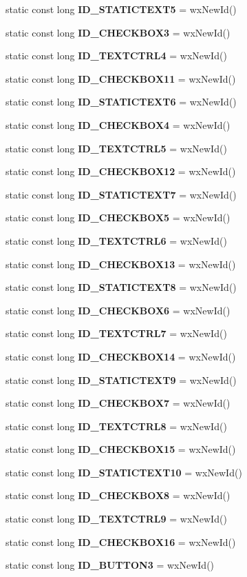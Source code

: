 \begin{DoxyCompactItemize}
\item 
static const long {\bf I\+D\+\_\+\+S\+T\+A\+T\+I\+C\+T\+E\+X\+T5} = wx\+New\+Id()
\item 
static const long {\bf I\+D\+\_\+\+C\+H\+E\+C\+K\+B\+O\+X3} = wx\+New\+Id()
\item 
static const long {\bf I\+D\+\_\+\+T\+E\+X\+T\+C\+T\+R\+L4} = wx\+New\+Id()
\item 
static const long {\bf I\+D\+\_\+\+C\+H\+E\+C\+K\+B\+O\+X11} = wx\+New\+Id()
\item 
static const long {\bf I\+D\+\_\+\+S\+T\+A\+T\+I\+C\+T\+E\+X\+T6} = wx\+New\+Id()
\item 
static const long {\bf I\+D\+\_\+\+C\+H\+E\+C\+K\+B\+O\+X4} = wx\+New\+Id()
\item 
static const long {\bf I\+D\+\_\+\+T\+E\+X\+T\+C\+T\+R\+L5} = wx\+New\+Id()
\item 
static const long {\bf I\+D\+\_\+\+C\+H\+E\+C\+K\+B\+O\+X12} = wx\+New\+Id()
\item 
static const long {\bf I\+D\+\_\+\+S\+T\+A\+T\+I\+C\+T\+E\+X\+T7} = wx\+New\+Id()
\item 
static const long {\bf I\+D\+\_\+\+C\+H\+E\+C\+K\+B\+O\+X5} = wx\+New\+Id()
\item 
static const long {\bf I\+D\+\_\+\+T\+E\+X\+T\+C\+T\+R\+L6} = wx\+New\+Id()
\item 
static const long {\bf I\+D\+\_\+\+C\+H\+E\+C\+K\+B\+O\+X13} = wx\+New\+Id()
\item 
static const long {\bf I\+D\+\_\+\+S\+T\+A\+T\+I\+C\+T\+E\+X\+T8} = wx\+New\+Id()
\item 
static const long {\bf I\+D\+\_\+\+C\+H\+E\+C\+K\+B\+O\+X6} = wx\+New\+Id()
\item 
static const long {\bf I\+D\+\_\+\+T\+E\+X\+T\+C\+T\+R\+L7} = wx\+New\+Id()
\item 
static const long {\bf I\+D\+\_\+\+C\+H\+E\+C\+K\+B\+O\+X14} = wx\+New\+Id()
\item 
static const long {\bf I\+D\+\_\+\+S\+T\+A\+T\+I\+C\+T\+E\+X\+T9} = wx\+New\+Id()
\item 
static const long {\bf I\+D\+\_\+\+C\+H\+E\+C\+K\+B\+O\+X7} = wx\+New\+Id()
\item 
static const long {\bf I\+D\+\_\+\+T\+E\+X\+T\+C\+T\+R\+L8} = wx\+New\+Id()
\item 
static const long {\bf I\+D\+\_\+\+C\+H\+E\+C\+K\+B\+O\+X15} = wx\+New\+Id()
\item 
static const long {\bf I\+D\+\_\+\+S\+T\+A\+T\+I\+C\+T\+E\+X\+T10} = wx\+New\+Id()
\item 
static const long {\bf I\+D\+\_\+\+C\+H\+E\+C\+K\+B\+O\+X8} = wx\+New\+Id()
\item 
static const long {\bf I\+D\+\_\+\+T\+E\+X\+T\+C\+T\+R\+L9} = wx\+New\+Id()
\item 
static const long {\bf I\+D\+\_\+\+C\+H\+E\+C\+K\+B\+O\+X16} = wx\+New\+Id()
\item 
static const long {\bf I\+D\+\_\+\+B\+U\+T\+T\+O\+N3} = wx\+New\+Id()
\end{DoxyCompactItemize}
